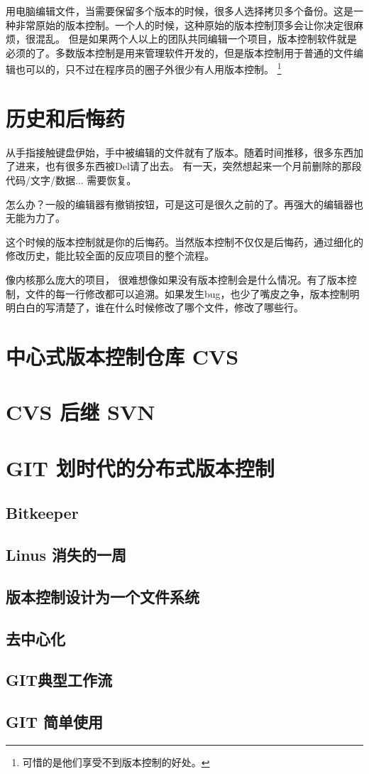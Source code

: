 
用电脑编辑文件，当需要保留多个版本的时候，很多人选择拷贝多个备份。这是一种非常原始的版本控制。一个人的时候，这种原始的版本控制顶多会让你决定很麻烦，很混乱。
但是如果两个人以上的团队共同编辑一个项目，版本控制软件就是必须的了。多数版本控制是用来管理软件开发的，但是版本控制用于普通的文件编辑也可以的，只不过在程序员的圈子外很少有人用版本控制。
\footnote{可惜的是他们享受不到版本控制的好处。}

\section{历史和后悔药}

从手指接触键盘伊始，手中被编辑的文件就有了版本。随着时间推移，很多东西加了进来，也有很多东西被Del请了出去。
有一天，突然想起来一个月前删除的那段代码/文字/数据... 需要恢复。

怎么办？一般的编辑器有撤销按钮，可是这可是很久之前的了。再强大的编辑器也无能为力了。

这个时候的版本控制就是你的后悔药。当然版本控制不仅仅是后悔药，通过细化的修改历史，能比较全面的反应项目的整个流程。


像内核那么庞大的项目， 很难想像如果没有版本控制会是什么情况。有了版本控制，文件的每一行修改都可以追溯。如果发生bug，也少了嘴皮之争，版本控制明明白白的写清楚了，谁在什么时候修改了哪个文件，修改了哪些行。

\section{   中心式版本控制仓库 CVS	}
\section{   CVS 后继 SVN	}
\section{GIT 划时代的分布式版本控制\label{sec:git}}
\subsection{  Bitkeeper	}
\subsection{  Linus 消失的一周	}
\subsection{  版本控制设计为一个文件系统	}
\subsection{ 去中心化	}
\subsection{  GIT典型工作流	}
\subsection{  GIT 简单使用	}


